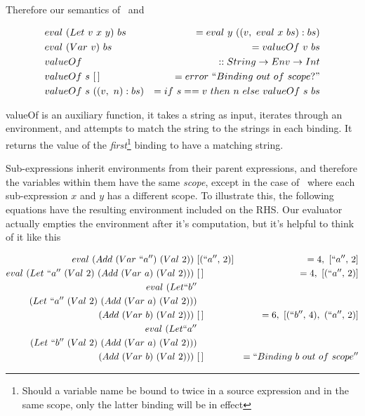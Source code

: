 \documentclass {article}
\begin{document}
Therefore our semantics of \ and \var\

\begin{eqnarray*}
&eval\ (Let\ v\ x\ y)\ bs &= eval\ y\ ((v,\ eval\ x\ bs):bs) \\
&eval\ (Var\ v)\ bs		    &=   valueOf\ v\ bs  \\
&valueOf\ &:: String \rightarrow Env \rightarrow Int \\
&valueOf \ s \ [\, ]\ &= error\ ``Binding\ out\ of\ scope?" \\
&valueOf\ s\ ((v,\ n):bs) &= if\ s == v\ then\ n\ else\ valueOf\ s\ bs
\end{eqnarray*}

valueOf is an auxiliary function,
it takes a string as input, iterates through an
environment, and attempts to match
the string to the strings in each binding.
It returns the value of the \emph{first}\footnote{
Should a variable name be bound to twice in a 
source expression and in the same scope,
only the latter binding will
be in effect} binding
to have a matching string. 
\linebreak

Sub-expressions inherit environments from their parent expressions,
and therefore the variables within them have the same \emph{scope},
except in the case of \ where each sub-expression $x$ and $y$
has a different scope. 
To illustrate this, the following equations
have the resulting environment included on the RHS.
Our evaluator actually empties the environment 
after it's computation, 
but it's helpful to think of it like this

\begin{align}
eval\ (Add\ (Var\ ``a'')\ (Val\ 2))\ &[(``a'',\, 2)] 
			&= 4,\ [``a'',\, 2] \nonumber \\
eval\ (Let\ ``a''\ (Val\ 2)\ (Add\ (Var\ a)\ (Val\ 2))  )\ &[\, ] 
		&= 4,\ [(``a'',\, 2)] \nonumber \\ 
eval\ (Let ``b'' \nonumber \\
		(Let\ ``a''\ (Val\ 2) \
			 (Add\ (Var\ a)\ (Val\ 2))  ) \nonumber \\
		(Add\ (Var\ b)\ (Val\ 2)))\ &[\, ] 
		&= 6,\ [(``b'',\, 4),\ (``a'',\, 2)] \label{egletlet1} \\ 
eval\ (Let ``a'' \nonumber \\
		(Let\ ``b''\ (Val\ 2) \
			 (Add\ (Var\ a)\ (Val\ 2))  ) \nonumber \\
		(Add\ (Var\ b)\ (Val\ 2)))\ &[\, ] 
		&= ``Binding\ b\ out\ of\ scope'' \label{egletlet2} \nonumber \\
\end{align}
\end{document}
